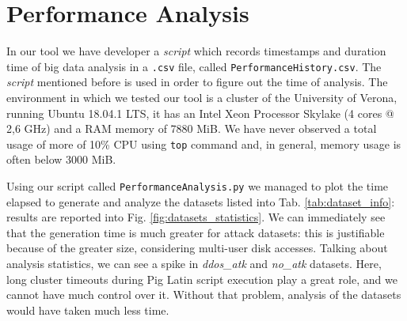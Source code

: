 \section{Performance Analysis}
\label{sec:perfanalysis}
In our tool we have developer a \textit{script} which records timestamps and duration time of big data analysis in a \texttt{.csv} file, called \texttt{PerformanceHistory.csv}. The \textit{script} mentioned before is used in order to figure out the time of analysis. 
The environment in which we tested our tool is a cluster of the University of Verona, running Ubuntu 18.04.1 LTS, it has an Intel Xeon Processor Skylake (4 cores @ 2,6 GHz) and a RAM memory of 7880 MiB. We have never observed a total usage of more of 10\% CPU using \texttt{top} command and, in general, memory usage is often below 3000 MiB.

Using our script called \texttt{PerformanceAnalysis.py} we managed to plot the time elapsed to generate and analyze the datasets listed into Tab. \ref{tab:dataset_info}: results are reported into Fig. \ref{fig:datasets_statistics}.
We can immediately see that the generation time is much greater for attack datasets: this is justifiable because of the greater size, considering multi-user disk accesses.
Talking about analysis statistics, we can see a spike in \textit{ddos\_atk} and \textit{no\_atk} datasets. Here, long cluster timeouts during Pig Latin script execution play a great role, and we cannot have much control over it. Without that problem, analysis of the datasets would have taken much less time.

